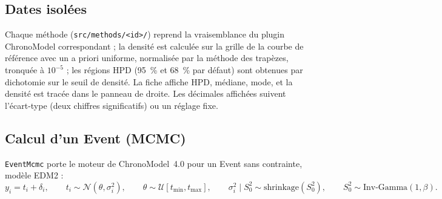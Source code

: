 \documentclass[11pt,a4paper]{article}
\newcommand{\code}[1]{\texttt{\small #1}}
\begin{document}
\subsection{Dates isolées}
Chaque méthode (\code{src/methods/<id>/}) reprend la vraisemblance du plugin ChronoModel correspondant ; la densité est
calculée sur la grille de la courbe de référence avec un a priori uniforme, normalisée par la méthode des trapèzes,
tronquée à $10^{-5}$ ; les régions HPD (95~\% et 68~\% par défaut) sont obtenues par dichotomie sur le seuil de
densité. La fiche affiche HPD, médiane, mode, et la densité est tracée dans le panneau de droite. Les décimales affichées
suivent l'écart-type (deux chiffres significatifs) ou un réglage fixe.

\subsection{Calcul d'un Event (MCMC)}
\code{EventMcmc} porte le moteur de ChronoModel~4.0 pour un Event sans contrainte, modèle EDM2 :
\[
  y_i = t_i + \delta_i, \qquad t_i \sim \mathcal N(\theta, \sigma_i^2), \qquad
  \theta \sim \mathcal U[t_{\min}, t_{\max}], \qquad \sigma_i^2 \mid S_0^2 \sim \text{shrinkage}(S_0^2),
  \qquad S_0^2 \sim \text{Inv-Gamma}(1,\beta).
\]
\end{document}
